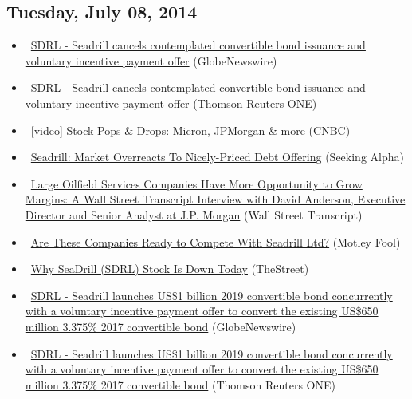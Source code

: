 \documentclass[11pt,asymmetric]{article}
\begin{document}
\subsection*{Tuesday, July 08, 2014}
\begin{itemize}
\item\ \href{http://finance.yahoo.com/news/sdrl-seadrill-cancels-contemplated-convertible-223134134.html}{SDRL - Seadrill cancels contemplated convertible bond issuance and voluntary incentive payment offer} (GlobeNewswire)
\item\ \href{http://finance.yahoo.com/news/sdrl-seadrill-cancels-contemplated-convertible-222802737.html}{SDRL - Seadrill cancels contemplated convertible bond issuance and voluntary incentive payment offer} (Thomson Reuters ONE)
\item\ \href{http://video.cnbc.com/gallery/?video=3000290612&__source=yahoo%7cheadline%7cquote%7cvideo%7c&par=yahoo}{[video] Stock Pops \& Drops: Micron, JPMorgan \& more} (CNBC)
\item\ \href{http://seekingalpha.com/article/2304695-seadrill-market-overreacts-to-nicely-priced-debt-offering?source=yahoo}{Seadrill: Market Overreacts To Nicely-Priced Debt Offering} (Seeking Alpha)
\item\ \href{http://finance.yahoo.com/news/large-oilfield-services-companies-more-154600457.html}{Large Oilfield Services Companies Have More Opportunity to Grow Margins: A Wall Street Transcript Interview with David Anderson, Executive Director and Senior Analyst at J.P. Morgan} (Wall Street Transcript)
\item\ \href{http://www.fool.com/investing/general/2014/07/08/are-these-companies-ready-to-compete-with-seadrill.aspx?source=eogyholnk0000001}{Are These Companies Ready to Compete With Seadrill Ltd?} (Motley Fool)
\item\ \href{http://www.thestreet.com/story/12767421/1/why-seadrill-sdrl-stock-is-down-today.html?puc=yahoo&cm_ven=YAHOO}{Why SeaDrill (SDRL) Stock Is Down Today} (TheStreet)
\item\ \href{http://finance.yahoo.com/news/sdrl-seadrill-launches-us-1-061621588.html}{SDRL - Seadrill launches US\$1 billion 2019 convertible bond concurrently with a voluntary incentive payment offer to convert the existing US\$650 million 3.375\% 2017 convertible bond} (GlobeNewswire)
\item\ \href{http://finance.yahoo.com/news/sdrl-seadrill-launches-us-1-061202013.html}{SDRL - Seadrill launches US\$1 billion 2019 convertible bond concurrently with a voluntary incentive payment offer to convert the existing US\$650 million 3.375\% 2017 convertible bond} (Thomson Reuters ONE)
\end{itemize}
\end{document}
